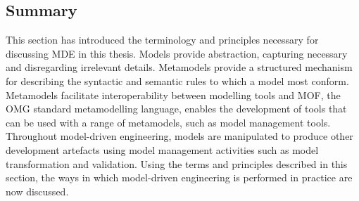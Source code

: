 \subsection{Summary}
This section has introduced the terminology and principles necessary for discussing MDE in this thesis. Models provide abstraction, capturing necessary and disregarding irrelevant details. Metamodels provide a structured mechanism for describing the syntactic and semantic rules to which a model most conform. Metamodels facilitate interoperability between modelling tools and MOF, the OMG standard metamodelling language, enables the development of tools that can be used with a range of metamodels, such as model management tools. Throughout model-driven engineering, models are manipulated to produce other development artefacts using model management activities such as model transformation and validation. Using the terms and principles described in this section, the ways in which model-driven engineering is performed in practice are now discussed.